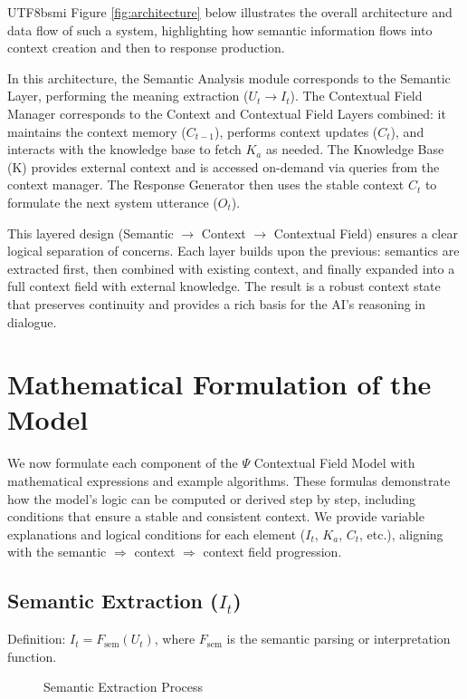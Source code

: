 \documentclass{article}
\begin{document}
\begin{CJK*}{UTF8}{bsmi}
Figure \ref{fig:architecture} below illustrates the overall architecture and data flow of such a system, highlighting how semantic information flows into context creation and then to response production.

In this architecture, the Semantic Analysis module corresponds to the Semantic Layer, performing the meaning extraction ($U_t \to I_t$). The Contextual Field Manager corresponds to the Context and Contextual Field Layers combined: it maintains the context memory ($C_{t-1}$), performs context updates ($C_t$), and interacts with the knowledge base to fetch $K_a$ as needed. The Knowledge Base (K) provides external context and is accessed on-demand via queries from the context manager. The Response Generator then uses the stable context $C_t$ to formulate the next system utterance ($O_t$).

This layered design (Semantic $\to$ Context $\to$ Contextual Field) ensures a clear logical separation of concerns. Each layer builds upon the previous: semantics are extracted first, then combined with existing context, and finally expanded into a full context field with external knowledge. The result is a robust context state that preserves continuity and provides a rich basis for the AI’s reasoning in dialogue.

\section{Mathematical Formulation of the Model}
We now formulate each component of the $\Psi$ Contextual Field Model with mathematical expressions and example algorithms. These formulas demonstrate how the model’s logic can be computed or derived step by step, including conditions that ensure a stable and consistent context. We provide variable explanations and logical conditions for each element ($I_t$, $K_a$, $C_t$, etc.), aligning with the semantic $\Rightarrow$ context $\Rightarrow$ context field progression.

\subsection{Semantic Extraction ($I_t$)}
Definition: $I_t = F_{\text{sem}}(U_t)$, where $F_{\text{sem}}$ is the semantic parsing or interpretation function.

\begin{figure}[htbp] %
    \centering
    \caption{Semantic Extraction Process}
    \label{fig:sem_extraction}
\end{figure}


\end{CJK*}
\end{document}
